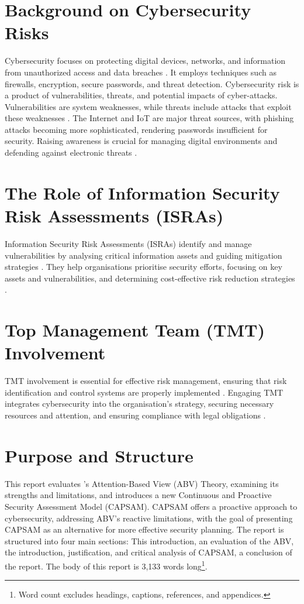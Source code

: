 \section{Background on Cybersecurity Risks}
Cybersecurity focuses on protecting digital devices, networks, and information from unauthorized access and data breaches \citep{mijwil2023exploring}. It employs techniques such as firewalls, encryption, secure passwords, and threat detection. Cybersecurity risk is a product of vulnerabilities, threats, and potential impacts of cyber-attacks. Vulnerabilities are system weaknesses, while threats include attacks that exploit these weaknesses \citep{prasad2020cyber}. The Internet and IoT are major threat sources, with phishing attacks becoming more sophisticated, rendering passwords insufficient for security. Raising awareness is crucial for managing digital environments and defending against electronic threats \citep{mijwil2023exploring}.

\section{The Role of Information Security Risk Assessments (ISRAs)}
Information Security Risk Assessments (ISRAs) identify and manage vulnerabilities by analysing critical information assets and guiding mitigation strategies \citep{shedden2010information}. They help organisations prioritise security efforts, focusing on key assets and vulnerabilities, and determining cost-effective risk reduction strategies \citep{shedden2010information}.

\section{Top Management Team (TMT) Involvement}
TMT involvement is essential for effective risk management, ensuring that risk identification and control systems are properly implemented \citep{fazlida2015information}. Engaging TMT integrates cybersecurity into the organisation's strategy, securing necessary resources and attention, and ensuring compliance with legal obligations \citep{shaikh2023information}.

\section{Purpose and Structure}
This report evaluates \citet{shaikh2023information}'s Attention-Based View (ABV) Theory, examining its strengths and limitations, and introduces a new Continuous and Proactive Security Assessment Model (CAPSAM). CAPSAM offers a proactive approach to cybersecurity, addressing ABV's reactive limitations, with the goal of presenting CAPSAM as an alternative for more effective security planning. The report is structured into four main sections: This introduction, an evaluation of the ABV, the introduction, justification, and critical analysis of CAPSAM, a conclusion of the report. The body of this report is 3,133 words long\footnote{Word count excludes headings, captions, references, and appendices.}.